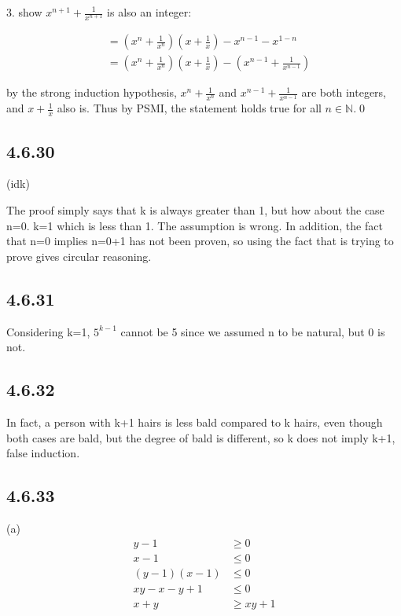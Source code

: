 \documentclass{article}
\begin{document}
3. show $x^{n+1}+\frac{1}{x^{n+1}}$ is also an integer:

$$\begin{aligned}&=(x^n+\frac1{x^n})(x+\frac1x)-x^{n-1}-x^{1-n}\\&=(x^n+\frac1{x^n})(x+\frac1x)-(x^{n-1}+\frac1{x^{n-1}})\end{aligned}$$

by the strong induction hypothesis, $x^n+\frac1{x^n}$ and $x^{n-1}+\frac1{x^{n-1}}$ are both integers, and $x+\frac1x$ also is. Thus by PSMI, the statement holds true for all $n\in\mathbb{N}$.\qed

\subsection*{4.6.30}

(idk)

The proof simply says that k is always greater than 1, but how about the case n=0. k=1 which is less than 1. The assumption is wrong. In addition, the fact that n=0 implies n=0+1 has not been proven, so using the fact that is trying to prove gives circular reasoning.

\subsection*{4.6.31}

Considering k=1, $5^{k-1}$ cannot be 5 since we assumed n to be natural, but 0 is not.

\subsection*{4.6.32}

In fact, a person with k+1 hairs is less bald compared to k hairs, even though both cases are bald, but the degree of bald is different, so k does not imply k+1, false induction.

\subsection*{4.6.33}

(a) $$\begin{aligned}y-1&\geq0\\x-1&\leq0\\(y-1)(x-1)&\leq0\\xy-x-y+1&\leq0\\x+y&\geq xy+1\end{aligned}$$
\end{document}
